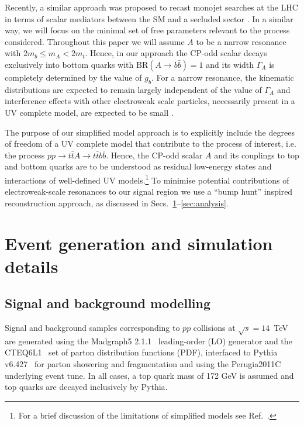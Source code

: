 \documentclass[preprintnumbers,superscriptaddress,nofootinbib,aps,prd,floatfix]{revtex4}
\newcommand{\BR} {\ensuremath{\mathrm{BR}}}
\begin{document}
Recently, a similar approach was proposed to recast monojet searches at the LHC in terms of scalar mediators between the SM and a secluded sector \cite{Buckley:2014fba,Harris:2014hga,Haisch:2015ioa,Khoze:2015sra}. In a similar way, we will focus on the minimal set of free parameters relevant to the process considered. Throughout this paper we will assume $A$ to be a narrow resonance with $2 m_b \leq m_A < 2m_t$. Hence, in our approach the CP-odd scalar decays exclusively into bottom quarks with $\BR(A\to b\bar{b})=1$ and its width $\Gamma_A$ is completely determined by the value of $g_b$. For a narrow resonance, the kinematic distributions are expected to remain largely independent of the value of $\Gamma_A$ and interference effects with other electroweak scale particles, necessarily present in a UV complete model, are expected to be small \cite{Kauer:2015hia, Englert:2015zra}.

The purpose of our simplified model approach is to explicitly include the degrees of freedom of a UV complete model that contribute to the process of interest, i.e. the process $pp \to t\bar{t} A \to t\bar{t}b\bar{b} $. Hence, the CP-odd scalar $A$ and its couplings to top and bottom quarks are to be understood as residual low-energy states and interactions of well-defined UV models.\footnote{For a brief discussion of the limitations of simplified models see Ref.~\cite{Chala:2015ama}.} To minimise potential contributions of electroweak-scale resonances to our signal region we use a ``bump hunt'' inspired reconstruction approach, as discussed in Secs.~\ref{sec:generation}--\ref{sec:analysis}.


\section{Event generation and simulation details}
\label{sec:generation}

\subsection{Signal and background modelling}

Signal and background samples corresponding to $pp$ collisions at $\sqrt{s}=14$~TeV are generated using 
the {\sc Madgraph5} 2.1.1~\cite{Alwall:2011uj} leading-order (LO) generator and the  CTEQ6L1~\cite{Nadolsky:2008zw}  
set of parton distribution functions (PDF), interfaced to {\sc Pythia} v6.427~\cite{Sjostrand:2006za}  for parton 
showering and fragmentation and using the Perugia2011C~\cite{Skands:2010ak}  underlying event tune. In all cases, a top quark mass 
of 172 GeV is assumed and top quarks are decayed inclusively by {\sc Pythia}. 
\end{document}
